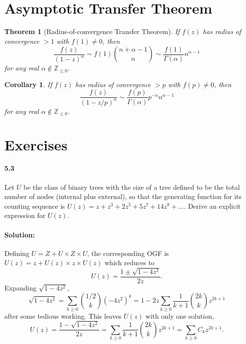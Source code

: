 \documentclass{article}
\newtheorem{corollary}{Corollary}
\newtheorem{theorem}{Theorem}
\begin{document}
\section{Asymptotic Transfer Theorem}

\begin{theorem}[Radius-of-convergence Transfer Theorem]
  If $f(z)$ has radius of convergence $> 1$ with $f(1) \neq 0$, then
  \begin{equation*}
    [z^n]\frac{f(z)}{(1 - z)^{\alpha}}
      \sim f(1)\binom{n + \alpha - 1}{n}
      \sim \frac{f(1)}{\Gamma(\alpha)}n^{\alpha - 1}
  \end{equation*} for any real $\alpha \notin \mathbb{Z}_{\leq 0}$.
\end{theorem}

\begin{corollary}
  If $f(z)$ has radius of convergence $> p$ with $f(p) \neq 0$, then
  \begin{equation*}
    [z^n]\frac{f(z)}{(1 - z/p)^{\alpha}}
      \sim \frac{f(p)}{\Gamma(\alpha)}p^{-n}n^{\alpha - 1}
  \end{equation*} for any real $\alpha \notin \mathbb{Z}_{\leq 0}$.
\end{corollary}

\section*{Exercises}

\paragraph{5.3} Let $U$ be the class of binary trees with the size of a tree
defined to be the total number of nodes (internal plus external), so that the
generating function for its counting sequence is $U(z) = z + z^3 + 2z^5 + 5z^7
+ 14z^9 + \ldots$. Derive an explicit expression for $U(z)$.

\paragraph{Solution:} Defining $U = Z + U \times Z \times U$, the corresponding
OGF is $U(z) = z + U(z) \times z \times U(z)$ which reduces to
\begin{equation*}
  U(z) = \frac{1 \pm \sqrt{1 - 4z^2}}{2z}.
\end{equation*} Expanding $\sqrt{1 - 4z^2}$, \begin{equation*}
\sqrt{1 - 4z^2} = \sum_{k \geq 0} \binom{1/2}{k}(-4z^2)^k
  = 1 - 2z\sum_{k \geq 0} \frac{1}{k + 1}\binom{2k}{k}z^{2k + 1}
\end{equation*} after some tedious working. This leaves $U(z)$ with only one
solution, \begin{equation*}
  U(z) = \frac{1 - \sqrt{1 - 4z^2}}{2z}
  = \sum_{k \geq 0} \frac{1}{k + 1}\binom{2k}{k}z^{2k + 1}
  = \sum_{k \geq 0} C_kz^{2k + 1}.
\end{equation*}
\end{document}
